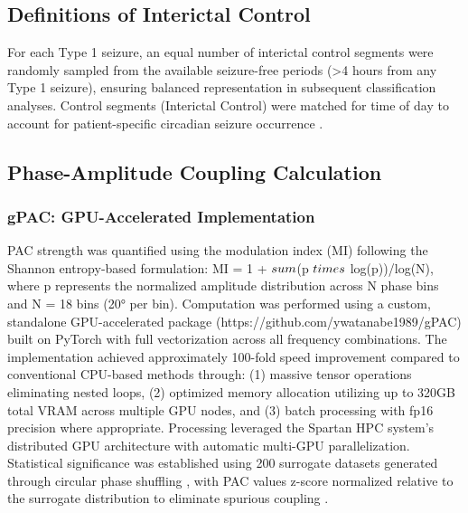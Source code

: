 \subsection{Definitions of Interictal Control}

For each Type 1 seizure, an equal number of interictal control segments were randomly sampled from the available seizure-free periods (>4 hours from any Type 1 seizure), ensuring balanced representation in subsequent classification analyses. Control segments (Interictal Control) were matched for time of day to account for patient-specific circadian seizure occurrence \cite{Kuhlmann2018SeizurePA}.


\subsection{Phase-Amplitude Coupling Calculation}
\subsubsection{gPAC: GPU-Accelerated Implementation}
PAC strength was quantified using the modulation index (MI) \cite{Tort2010MeasuringPCE} following the Shannon entropy-based formulation: MI = 1 + $\\sum$(p $\\times$ log(p))/log(N), where p represents the normalized amplitude distribution across N phase bins and N = 18 bins (20° per bin). Computation was performed using a custom, standalone GPU-accelerated package (https://github.com/ywatanabe1989/gPAC) built on PyTorch with full vectorization across all frequency combinations. The implementation achieved approximately 100-fold speed improvement compared to conventional CPU-based methods \cite{Combrisson2020TensorpacAOAH} through: (1) massive tensor operations eliminating nested loops, (2) optimized memory allocation utilizing up to 320GB total VRAM across multiple GPU nodes, and (3) batch processing with fp16 precision where appropriate. Processing leveraged the Spartan HPC system's distributed GPU architecture with automatic multi-GPU parallelization. Statistical significance was established using 200 surrogate datasets generated through circular phase shuffling \cite{Tort2010MeasuringPCE,Aru2014UntanglingCCD}, with PAC values z-score normalized relative to the surrogate distribution to eliminate spurious coupling \cite{Jensen2016DiscriminatingVFR}.

